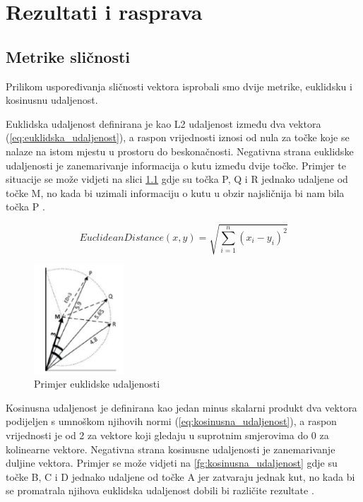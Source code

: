 \documentclass[times, utf8, proizvoljni, numeric]{fer}
\begin{document}
\chapter{Rezultati i rasprava}

\section{Metrike sličnosti}

Prilikom uspoređivanja sličnosti vektora isprobali smo dvije metrike, euklidsku i kosinusnu udaljenost. 

Euklidska udaljenost definirana je kao L2 udaljenost između dva vektora (\ref{eq:euklidska_udaljenost}), a raspon vrijednosti iznosi od nula za točke koje se nalaze na istom mjestu u prostoru do beskonačnosti. Negativna strana euklidske udaljenosti je zanemarivanje informacija o kutu između dvije točke. Primjer te situacije se može vidjeti na slici \ref{fg:euklidska_udaljenost} gdje su točka P, Q i R jednako udaljene od točke M, no kada bi uzimali informaciju o kutu u obzir najsličnija bi nam bila točka P \cite{VectorSimilarity}.

\begin{equation}
\label{eq:euklidska_udaljenost}
EuclideanDistance(x,y) = \sqrt{\sum_{i=1}^n (x_i-y_i)^2}    
\end{equation}

\begin{figure}[!ht]
	\begin{center}
		\captionsetup{justification=centering}
		\includegraphics[width=0.3\textwidth]{./imgs/euklidska_udaljenost.png}
		\caption{Primjer euklidske udaljenosti \cite{VectorSimilarity}}
		\label{fg:euklidska_udaljenost}
	\end{center}
\end{figure}

Kosinusna udaljenost je definirana kao jedan minus skalarni produkt dva vektora podijeljen s umnoškom njihovih normi (\ref{eq:kosinusna_udaljenost}), a raspon vrijednosti je od 2 za vektore koji gledaju u suprotnim smjerovima do 0 za kolinearne vektore. Negativna strana kosinusne udaljenosti je zanemarivanje duljine vektora. Primjer se može vidjeti na \ref{fg:kosinusna_udaljenost} gdje su točke B, C i D jednako udaljene od točke A jer zatvaraju jednak kut, no kada bi se promatrala njihova euklidska udaljenost dobili bi različite rezultate \cite{VectorSimilarity}.
\end{document}
